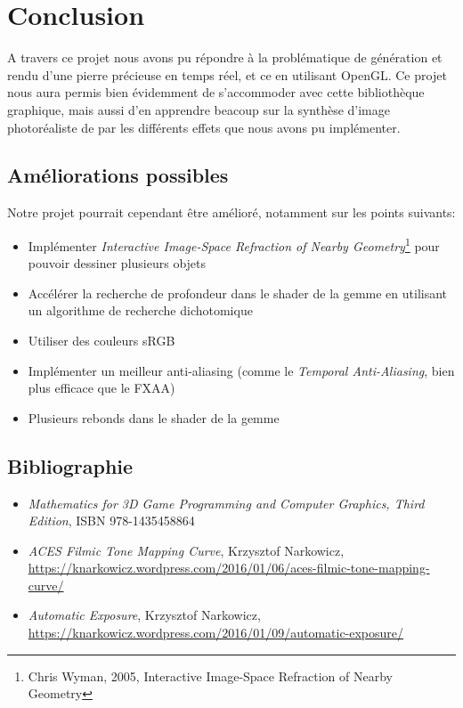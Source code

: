 \documentclass[a4paper,12pt]{article}
\begin{document}
\section{Conclusion}
A travers ce projet nous avons pu répondre à la problématique de génération et rendu d'une
pierre précieuse en temps réel, et ce en utilisant OpenGL. Ce projet nous aura permis bien
évidemment de s'accommoder avec cette bibliothèque graphique, mais aussi d'en apprendre beacoup
sur la synthèse d'image photoréaliste de par les différents effets que nous avons pu implémenter.

\subsection{Améliorations possibles}
Notre projet pourrait cependant être amélioré, notamment sur les points suivants:
\begin{itemize}
    \item Implémenter \emph{Interactive Image-Space Refraction of Nearby Geometry}\footnote{Chris Wyman, 2005, Interactive Image-Space Refraction of Nearby Geometry} pour pouvoir dessiner plusieurs objets
    \item Accélérer la recherche de profondeur dans le shader de la gemme en utilisant un algorithme de recherche dichotomique
    \item Utiliser des couleurs sRGB
    \item Implémenter un meilleur anti-aliasing (comme le \emph{Temporal Anti-Aliasing}, bien plus efficace que le FXAA)
    \item Plusieurs rebonds dans le shader de la gemme
\end{itemize}

\subsection{Bibliographie}
\begin{itemize}
    \item \emph{Mathematics for 3D Game Programming and Computer Graphics, Third Edition}, ISBN 978-1435458864
    \item \emph{ACES Filmic Tone Mapping Curve}, Krzysztof Narkowicz, \url{https://knarkowicz.wordpress.com/2016/01/06/aces-filmic-tone-mapping-curve/}
    \item \emph{Automatic Exposure}, Krzysztof Narkowicz, \url{https://knarkowicz.wordpress.com/2016/01/09/automatic-exposure/}
\end{itemize}
\end{document}

